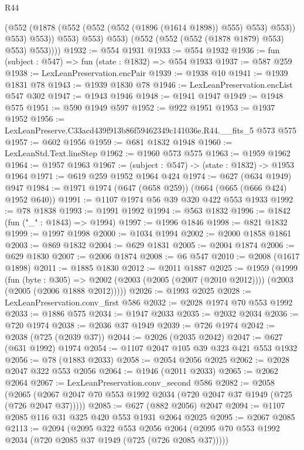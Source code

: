 \begin{lexlean}{R44}
\begin{coremodule}
                    (@552 (@1878 (@552 (@552 (@552 (@1896 (@1614 @1898)) @555) @553) @553)) @553)
                    @553))
                @553)
              @553)
            @553)
          (@552 (@552 (@552 (@1878 @1879) @553) @553) @553))))
@1932 := @554 @1931
@1933 := @554 @1932
@1936 := fun (subject : @547) => fun (state : @1832) => @554 @1933
@1937 := @587 @259
@1938 := LexLeanPreservation.encPair
@1939 := @1938 @10
@1941 := @1939 @1831 @78
@1943 := @1939 @1830 @78
@1946 := LexLeanPreservation.encList @547 @302
@1947 := @1943 @1946
@1948 := @1941 @1947
@1949 := @1948 @575
@1951 := @590 @1949 @597
@1952 := @922 @1951
@1953 := @1937 @1952
@1956 := LexLeanPreserve.C33acd439f913b86f59462349c141036e.R44.__fits_5 @573 @575
@1957 := @602 @1956
@1959 := @681 @1832 @1948
@1960 := LexLeanStd.Text.lineStep
@1962 := @1960 @573 @575
@1963 := @1959 @1962
@1964 := @1957 @1963
@1967 := (subject : @547) -> (state : @1832) -> @1953 @1964
@1971 := @619 @259 @1952 @1964 @424
@1974 := @627 (@634 @1949) @947
@1984 := @1971 @1974 (@647 (@658 @259)) (@664 (@665 (@666 @424) @1952 @640))
@1991 := @1107 @1974 @56 @39 @320 @422 @553 @1933
@1992 := @78 @1838
@1993 := @1991 @1992
@1994 := @563 @1832
@1996 := @1842 (fun ("_" : @1843) => @1994)
@1997 := @1996 @1846
@1998 := @821 @1832
@1999 := @1997 @1998
@2000 := @1034 @1994
@2002 := @2000 @1858 @1861
@2003 := @869 @1832
@2004 := @629 @1831
@2005 := @2004 @1874
@2006 := @629 @1830
@2007 := @2006 @1874
@2008 := @6 @547
@2010 := @2008 (@1617 @1898)
@2011 := @1885 @1830
@2012 := @2011 @1887
@2025 := @1959
    (@1999
      (fun (byte : @305) =>
      @2002 (@2003 (@2005 (@2007 (@2010 @2012)))) (@2003 (@2005 (@2006 @1888 @2012)))))
@2026 := @1993 @2025
@2028 := LexLeanPreservation.conv_first @586
@2032 := @2028 @1974 @70 @553 @1992
@2033 := @1886 @575
@2034 := @1947 @2033
@2035 := @2032 @2034
@2036 := @720 @1974
@2038 := @2036 @37 @1949
@2039 := @726 @1974
@2042 := @2038 (@725 (@2039 @37))
@2044 := @2026 (@2035 @2042)
@2047 := @627 (@631 @1992) @1974
@2054 := @1107 @2047 @105 @39 @323 @421 @553 @1932
@2056 := @78 (@1883 @2033)
@2058 := @2054 @2056 @2025
@2062 := @2028 @2047 @322 @553 @2056
@2064 := @1946 (@2011 @2033)
@2065 := @2062 @2064
@2067 := LexLeanPreservation.conv_second @586
@2082 := @2058
    (@2065 (@2067 @2047 @70 @553 @1992 @2034 (@720 @2047 @37 @1949 (@725 (@726 @2047 @37)))))
@2085 := @627 (@882 @2056) @2047
@2094 := @1107 @2085 @116 @31 @325 @420 @553 @1931 @2064 @2025
@2095 := @2067 @2085
@2113 := @2094
    (@2095
      @322
      @553
      @2056
      @2064
      (@2095 @70 @553 @1992 @2034 (@720 @2085 @37 @1949 (@725 (@726 @2085 @37)))))

\end{coremodule}
\end{lexlean}
